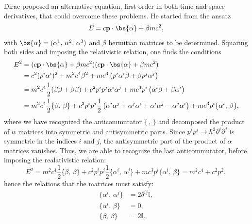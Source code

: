 Dirac proposed an alternative equation, first order in both time and space derivatives, that could overcome these problems. He started from the ansatz
\begin{equation}
    E = c \mathbf{p} \cdot \bs{\alpha} + \beta m c^2,
    \label{eq:dirac_equation_alpha_beta}
\end{equation}
with \(\bs{\alpha} = (\alpha^1,\,\alpha^2,\,\alpha^3)\) and \(\beta\) hermitian matrices to be determined. Squaring both sides and imposing the relativistic relation, one finds the conditions
\[
    \begin{aligned}
        E^2 & = (c \mathbf{p} \cdot \bs{\alpha} + \beta m c^2)(c \mathbf{p} \cdot \bs{\alpha} + \beta m c^2)                                                                                                 \\
            & = c^2 (p^i \alpha^i)^2 + m^2 c^4 \beta^2 + mc^3 \left(p^i \alpha^i \beta + \beta p^j \alpha^j \right)                                                                                          \\
            & = m^2 c^4 \frac{1}{2} (\beta\beta + \beta\beta) + c^2 p^i p^j \alpha^i \alpha^j + m c^3 p^i \left(\alpha^i \beta + \beta \alpha^i \right)                                                      \\
            & = m^2 c^4 \frac{1}{2} \{\beta,\,\beta\} + c^2 p^i p^j \frac{1}{2}\left(\alpha^i \alpha^j + \alpha^j \alpha^i + \alpha^i \alpha^j - \alpha^j \alpha^i \right) + m c^3 p^i \{\alpha^i,\,\beta\},
    \end{aligned}
\]
where we have recognized the anticommutator \(\{\,,\,\}\) and decomposed the product of \(\alpha\) matrices into symmetric and antisymmetric parts. Since \(p^i p^j \to \hbar^2 \partial^i \partial^j\) is symmetric in the indices \(i\) and \(j\), the antisymmetric part of the product of \(\alpha\) matrices vanishes. Thus, we are able to recognize the last anticommutator, before imposing the realativistic relation:
\[
    E^2 = m^2 c^4 \frac{1}{2}\{\beta,\,\beta\} + c^2 p^i p^j \frac{1}{2} \{\alpha^i,\,\alpha^j\} + m c^3 p^i \{\alpha^i,\,\beta\} = m^2 c^4 + c^2 p^2,
\]
hence the relations that the matrices must satisfy:
\begin{equation}
    \begin{aligned}
        \{\alpha^i,\,\alpha^j\} & = 2 \delta^{ij} \mathbb{I}, \\
        \{\alpha^i,\,\beta\}    & = 0,                        \\
        \{\beta,\,\beta\}       & = 2 \mathbb{I}.
    \end{aligned}
    \label{eq:clifford_relations}
\end{equation}
